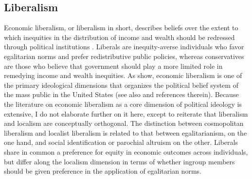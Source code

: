 \documentclass[article,12pt]{memoir}
\begin{document}
\subsection{Liberalism} 
Economic liberalism, or liberalism in short, describes beliefs over the extent to which inequities in the distribution of income and wealth should be redressed through political institutions \citep{treier_nature_2009}. Liberals are inequity-averse individuals who favor egalitarian norms and prefer redistributive public policies, whereas conservatives are those who believe that government should play a more limited role in remedying income and wealth inequities.  As \citet{treier_nature_2009} show, economic liberalism is one of the primary ideological dimensions that organizes the political belief system of the mass public in the United States (see also \citealp{feldman_understanding_2014} and references therein). Because the literature on economic liberalism as a core dimension of political ideology is extensive, I do not elaborate further on it here, except to reiterate that liberalism and localism are conceptually orthogonal.  The distinction between cosmopolitan liberalism and localist liberalism is related to that between egalitarianism, on the one hand, and social identification \citep{fowler_beyond_2007,shayo_model_2009,huddy_group_2013} or parochial altruism \citep{bernhard_parochial_2006} on the other. Liberals share in common a preference for equity in economic outcomes across individuals, but differ along the localism dimension in terms of whether ingroup members should be given preference in the application of egalitarian norms.
\end{document}
